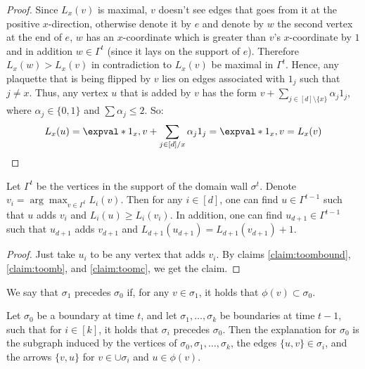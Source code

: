 \begin{proof}
  Since $L_{x}(v)$ is maximal, $v$ doesn't see edges that goes from it at the positive $x$-direction, otherwise denote it by $e$ and denote by $w$ the second vertex at the end of $e$, $w$ has an $x$-coordinate which is greater than $v$'s $x$-coordinate by $1$ and in addition $w \in \Gamma^{t}$ (since it lays on the support of $e$). Therefore $L_{x}(w) > L_{x}(v)$ in contradiction to $L_{x}(v)$ be maximal in $\Gamma^{t}$. 
Hence, any plaquette that is being flipped by $v$ lies on edges associated with $1_{j}$ such that $j \neq x$. Thus, any vertex $u$ that is added by $v$ has the form $v + \sum_{j \in [d] \setminus \{x\}} \alpha_{j}1_{j}$, where $\alpha_{j} \in \{0,1\}$ and $\sum \alpha_j \le 2$. So:
  \begin{equation*}
    \begin{split}
      L_{x}(u) = \expval*{1_{x}, v + \sum_{j \in [d]/x} \alpha_{j}1_{j}} = \expval*{1_{x},v} = L_{x}(v) 
    \end{split}
  \end{equation*}
\end{proof}

\begin{claim}
  \label{claim:total_shrinking}
Let $\Gamma^{t}$ be the vertices in the support of the domain wall $\sigma^{t}$. Denote $v_i = \arg \max_{v \in \Gamma^{t}} L_{i}(v)$. Then for any $i \in [d]$, one can find $u \in \Gamma^{t-1}$ such that $u$ adds $v_i$ and $L_{i}(u) \ge L_{i}(v_{i})$. In addition, one can find $u_{d+1} \in \Gamma^{t-1}$ such that $u_{d+1}$ adds $v_{d+1}$ and $L_{d+1}(u_{d+1}) = L_{d+1}(v_{d+1}) + 1$. 
\end{claim}
\begin{proof}
Just take $u_{i}$ to be any vertex that adds $v_{i}$. By claims \cref{claim:toombound}, \cref{claim:toomb}, and \cref{claim:toomc}, we get the claim.
\end{proof}



\begin{definition}
We say that $\sigma_{1}$ precedes $\sigma_{0}$ if, for any $v \in \sigma_{1}$, it holds that $\phi(v) \subset \sigma_{0}$.
\end{definition}
\begin{definition}[Explanation.]
Let $\sigma_{0}$ be a boundary at time $t$, and let $\sigma_{1}, \ldots, \sigma_{k}$ be boundaries at time $t-1$, such that for $i \in [k]$, it holds that $\sigma_{i}$ precedes $\sigma_{0}$. Then the explanation for $\sigma_{0}$ is the subgraph induced by the vertices of $\sigma_{0}, \sigma_{1}, \ldots, \sigma_{k}$, the edges $\{u,v\} \in \sigma_{i}$, and the arrows $\{v,u\}$ for $v \in \cup\sigma_{i}$ and $u \in \phi(v)$.
\end{definition}

